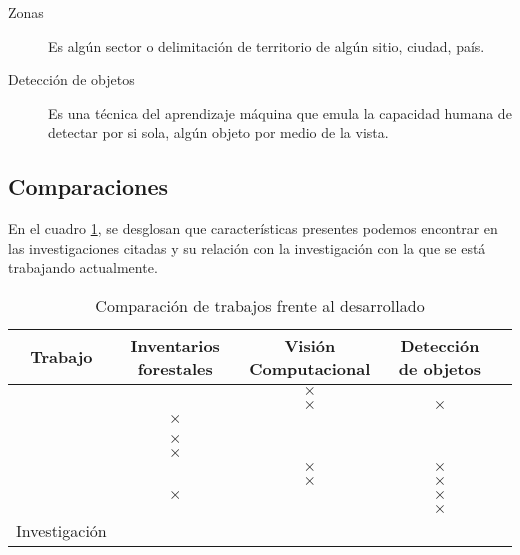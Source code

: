 \begin{description}
\item[Zonas]{Es algún sector o delimitación de territorio de algún sitio, ciudad, país.}
\end{description}

\begin{description}
\item[Detección de objetos]{Es una técnica del aprendizaje máquina que emula la capacidad humana de detectar por si sola, algún objeto por medio de la vista.}
\end{description}

\newpage

\subsection{Comparaciones}
En el cuadro \ref{tab:Comparación de trabajos frente al desarrollado}, se desglosan que características presentes podemos encontrar en las investigaciones citadas y su relación con la investigación con la que se está trabajando actualmente.\\
\renewcommand{\tablename}{Cuadro}
\begin{table}[hbt!]
	{\centering
	\caption{Comparación de trabajos frente al desarrollado}
	\begin{adjustbox}{width=\textwidth}
		\begin{tabular}{|c|c|c|c|c|}
			\hline
			Trabajo &  Inventarios forestales &  Visión Computacional & Detección de objetos\\
			\hline
			\citet{rf1} & \checkmark & $\times$ & \checkmark \\
			\hline
			\citet{rf2}&  \checkmark  &  $\times$ & $\times$  \\
			\hline
			\citet{rf3}& $\times$ & \checkmark & \checkmark  \\
			\hline	
			\citet{rf9}& \checkmark & \checkmark & \checkmark  \\
			\hline
			\citet{rf10}& $\times$ & \checkmark & \checkmark  \\
			\hline
			\citet{rf11}& $\times$ & \checkmark & \checkmark  \\
			\hline
			\citet{rf12}& \checkmark  & $\times$ & $\times$  \\
			\hline
			\citet{rf13}& \checkmark & $\times$ & $\times$  \\
			\hline
			\citet{rf14}&  $\times$ & \checkmark & $\times$   \\
			\hline
			\citet{rf15}& \checkmark & \checkmark & $\times$  \\
			\hline
			Investigación & \checkmark & \checkmark & \checkmark \\
			\hline
		\end{tabular}
	\end{adjustbox}
	\label{tab:Comparación de trabajos frente al desarrollado}}
\end{table}

